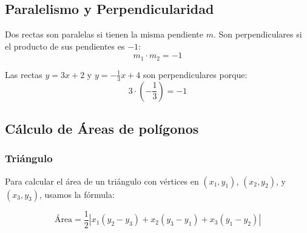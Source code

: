 \subsection{Paralelismo y Perpendicularidad}

Dos rectas son paralelas si tienen la misma pendiente \( m \). Son perpendiculares si el producto de sus pendientes es \(-1\):
\begin{equation}
    m_1 \cdot m_2 = - 1
\end{equation}

\begin{example}
    Las rectas \( y = 3x + 2 \) y \( y = -\frac{1}{3}x + 4 \) son perpendiculares porque:
\[
3 \cdot \left(-\frac{1}{3}\right) = -1
\]
\end{example}

\begin{center}
\end{center}
\subsection{Cálculo de Áreas de polígonos}


\subsubsection{Triángulo}
Para calcular el área de un triángulo con vértices en $(x_1, y_1)$, $(x_2, y_2)$, y $(x_3, y_3)$, usamos la fórmula:

\[ \text{Área} = \frac{1}{2} \left| x_1(y_2 - y_3) + x_2(y_3 - y_1) + x_3(y_1 - y_2) \right| \]

